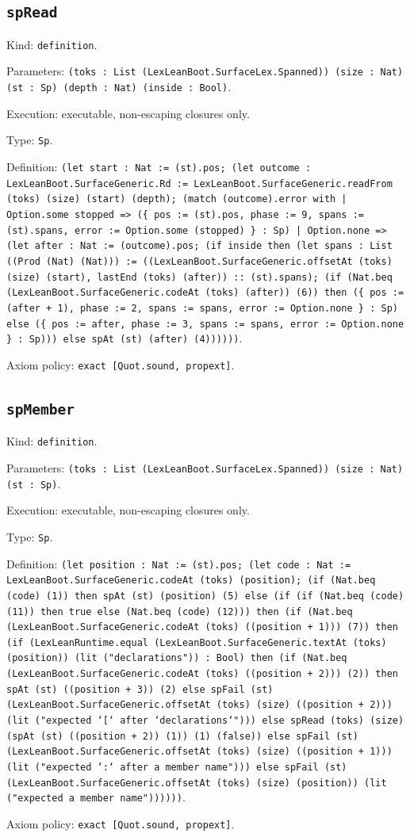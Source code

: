 \documentclass[11pt]{article}
\begin{document}
\subsection*{\texttt{spRead}}
\noindent Kind: \texttt{definition}.\par
\noindent Parameters: \texttt{(toks : List (LexLeanBoot.SurfaceLex.Spanned)) (size : Nat) (st : Sp) (depth : Nat) (inside : Bool)}.\par
\noindent Execution: executable, non-escaping closures only.\par
\noindent Type: \texttt{Sp}.\par
\noindent Definition: \texttt{(let start : Nat := (st).pos; (let outcome : LexLeanBoot.SurfaceGeneric.Rd := LexLeanBoot.SurfaceGeneric.readFrom (toks) (size) (start) (depth); (match (outcome).error with | Option.some stopped => (\{ pos := (st).pos, phase := 9, spans := (st).spans, error := Option.some (stopped) \} : Sp) | Option.none => (let after : Nat := (outcome).pos; (if inside then (let spans : List ((Prod (Nat) (Nat))) := ((LexLeanBoot.SurfaceGeneric.offsetAt (toks) (size) (start), lastEnd (toks) (after)) :: (st).spans); (if (Nat.beq (LexLeanBoot.SurfaceGeneric.codeAt (toks) (after)) (6)) then (\{ pos := (after + 1), phase := 2, spans := spans, error := Option.none \} : Sp) else (\{ pos := after, phase := 3, spans := spans, error := Option.none \} : Sp))) else spAt (st) (after) (4))))))}.\par
\noindent Axiom policy: \texttt{exact [Quot.sound, propext]}.\par
\subsection*{\texttt{spMember}}
\noindent Kind: \texttt{definition}.\par
\noindent Parameters: \texttt{(toks : List (LexLeanBoot.SurfaceLex.Spanned)) (size : Nat) (st : Sp)}.\par
\noindent Execution: executable, non-escaping closures only.\par
\noindent Type: \texttt{Sp}.\par
\noindent Definition: \texttt{(let position : Nat := (st).pos; (let code : Nat := LexLeanBoot.SurfaceGeneric.codeAt (toks) (position); (if (Nat.beq (code) (1)) then spAt (st) (position) (5) else (if (if (Nat.beq (code) (11)) then true else (Nat.beq (code) (12))) then (if (Nat.beq (LexLeanBoot.SurfaceGeneric.codeAt (toks) ((position + 1))) (7)) then (if (LexLeanRuntime.equal (LexLeanBoot.SurfaceGeneric.textAt (toks) (position)) (lit ("declarations")) : Bool) then (if (Nat.beq (LexLeanBoot.SurfaceGeneric.codeAt (toks) ((position + 2))) (2)) then spAt (st) ((position + 3)) (2) else spFail (st) (LexLeanBoot.SurfaceGeneric.offsetAt (toks) (size) ((position + 2))) (lit ("expected `[` after `declarations`"))) else spRead (toks) (size) (spAt (st) ((position + 2)) (1)) (1) (false)) else spFail (st) (LexLeanBoot.SurfaceGeneric.offsetAt (toks) (size) ((position + 1))) (lit ("expected `:` after a member name"))) else spFail (st) (LexLeanBoot.SurfaceGeneric.offsetAt (toks) (size) (position)) (lit ("expected a member name"))))))}.\par
\noindent Axiom policy: \texttt{exact [Quot.sound, propext]}.\par
\end{document}
